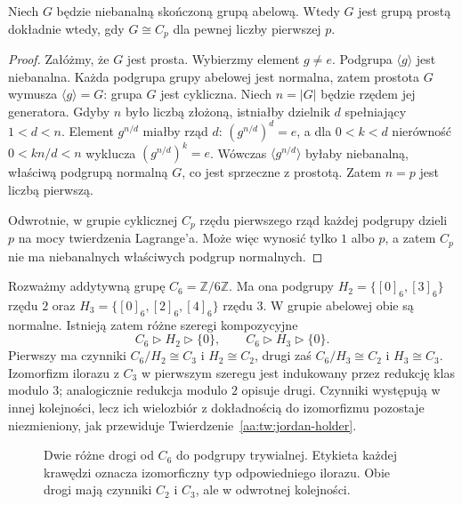 \begin{lemat}
\label{aa:lem:finite-abelian-simple}
Niech $G$ będzie niebanalną skończoną grupą abelową.
Wtedy $G$ jest grupą prostą dokładnie wtedy, gdy
$G\cong C_p$ dla pewnej liczby pierwszej $p$.
\end{lemat}
\begin{proof}
Załóżmy, że $G$ jest prosta. Wybierzmy element $g\ne e$.
Podgrupa $\langle g\rangle$ jest niebanalna. Każda podgrupa
grupy abelowej jest normalna, zatem prostota $G$ wymusza
$\langle g\rangle=G$: grupa $G$ jest cykliczna.
Niech $n=|G|$ będzie rzędem jej generatora.
Gdyby $n$ było liczbą złożoną, istniałby dzielnik $d$
spełniający $1<d<n$. Element $g^{n/d}$ miałby rząd $d$:
$(g^{n/d})^d=e$, a dla $0<k<d$ nierówność
$0<kn/d<n$ wyklucza $(g^{n/d})^k=e$.
Wówczas $\langle g^{n/d}\rangle$ byłaby niebanalną,
właściwą podgrupą normalną $G$, co jest sprzeczne
z prostotą. Zatem $n=p$ jest liczbą pierwszą.

Odwrotnie, w grupie cyklicznej $C_p$ rzędu pierwszego
rząd każdej podgrupy dzieli $p$ na mocy twierdzenia Lagrange'a.
Może więc wynosić tylko $1$ albo $p$, a zatem
$C_p$ nie ma niebanalnych właściwych podgrup normalnych.
\end{proof}

\begin{przyklad}
\label{aa:prz:jordan-c6}
Rozważmy addytywną grupę $C_6=\mathbb Z/6\mathbb Z$.
Ma ona podgrupy $H_2=\{[0]_6,[3]_6\}$ rzędu $2$
oraz $H_3=\{[0]_6,[2]_6,[4]_6\}$ rzędu $3$.
W grupie abelowej obie są normalne. Istnieją zatem
różne szeregi kompozycyjne
\[
 C_6\triangleright H_2\triangleright\{0\},\qquad
 C_6\triangleright H_3\triangleright\{0\}.
\]
Pierwszy ma czynniki $C_6/H_2\cong C_3$ i
$H_2\cong C_2$, drugi zaś $C_6/H_3\cong C_2$ i
$H_3\cong C_3$. Izomorfizm ilorazu z $C_3$
w pierwszym szeregu jest indukowany przez redukcję
klas modulo $3$; analogicznie redukcja modulo $2$
opisuje drugi. Czynniki występują w innej kolejności,
lecz ich wielozbiór z dokładnością do izomorfizmu
pozostaje niezmieniony, jak przewiduje
Twierdzenie~\ref{aa:tw:jordan-holder}.
\end{przyklad}

\begin{figure}[htbp]
\centering
{}
\caption{Dwie różne drogi od $C_6$ do podgrupy trywialnej.
 Etykieta każdej krawędzi oznacza izomorficzny typ odpowiedniego
 ilorazu. Obie drogi mają czynniki $C_2$ i $C_3$, ale w odwrotnej
 kolejności.}
\label{aa:fig:c6-composition-chains}
\end{figure}

